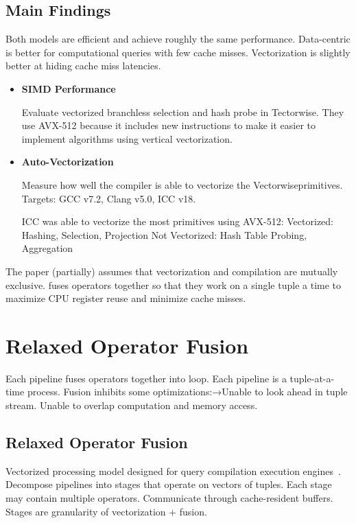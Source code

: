 \documentclass[11pt]{article}
\begin{document}
\subsection*{Main Findings}
Both models are efficient and achieve roughly the same performance. Data-centric is better for 
computational queries with few cache misses. Vectorization is slightly better at hiding cache miss 
latencies.
\begin{itemize}
	\item 
	\textbf{SIMD Performance}
	
	Evaluate vectorized branchless selection and hash probe in Tectorwise. They use AVX-512 because 
	it includes new instructions to make it easier to implement algorithms using vertical 
	vectorization. 
	
	\item 
	\textbf{Auto-Vectorization}
	
	Measure how well the compiler is able to vectorize the Vectorwiseprimitives. 
	Targets: GCC v7.2, Clang v5.0, ICC v18.
	
	ICC was able to vectorize the most primitives using AVX-512:
	Vectorized: Hashing, Selection, Projection
	Not Vectorized: Hash Table Probing, Aggregation
\end{itemize}

The paper (partially) assumes that vectorization and compilation are mutually exclusive.  fuses operators together so that they work on a single tuple a time to maximize CPU register reuse and minimize cache misses.

\section{Relaxed Operator Fusion}
Each pipeline fuses operators together into loop. Each pipeline is a tuple-at-a-time process.
Fusion inhibits some optimizations:→Unable to look ahead in tuple stream. Unable to overlap 
computation and memory access.

\subsection*{Relaxed Operator Fusion}
Vectorized processing model designed for query compilation execution engines~\cite{Menon2017}. Decompose pipelines into stages that operate on vectors of tuples. Each stage may contain multiple operators. Communicate through cache-resident buffers. Stages are granularity of vectorization + fusion.
\end{document}
